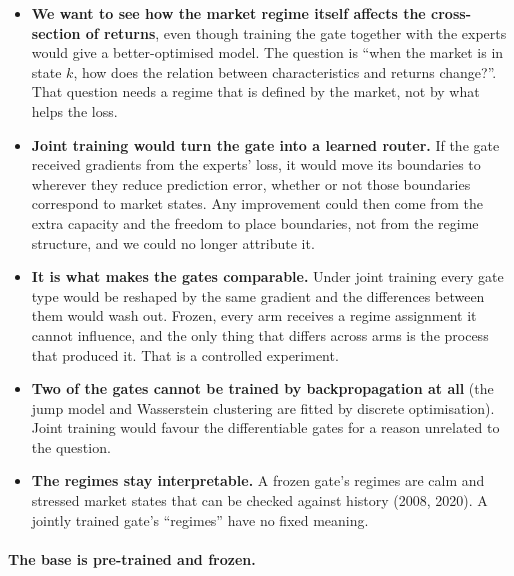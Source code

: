 \begin{whybox}
\begin{itemize}
\item \textbf{We want to see how the market regime itself affects the cross-section of returns}, even though
  training the gate together with the experts would give a better-optimised model. The question is
  ``when the market is in state $k$, how does the relation between characteristics and returns change?''.
  That question needs a regime that is defined by the market, not by what helps the loss.
\item \textbf{Joint training would turn the gate into a learned router.} If the gate received gradients from
  the experts' loss, it would move its boundaries to wherever they reduce prediction error, whether or not
  those boundaries correspond to market states. Any improvement could then come from the extra capacity
  and the freedom to place boundaries, not from the regime structure, and we could no longer attribute it.
\item \textbf{It is what makes the gates comparable.} Under joint training every gate type would be reshaped
  by the same gradient and the differences between them would wash out. Frozen, every arm receives a
  regime assignment it cannot influence, and the only thing that differs across arms is the process that
  produced it. That is a controlled experiment.
\item \textbf{Two of the gates cannot be trained by backpropagation at all} (the jump model and Wasserstein
  clustering are fitted by discrete optimisation). Joint training would favour the differentiable gates
  for a reason unrelated to the question.
\item \textbf{The regimes stay interpretable.} A frozen gate's regimes are calm and stressed market states that
  can be checked against history (2008, 2020). A jointly trained gate's ``regimes'' have no fixed meaning.
\end{itemize}
\end{whybox}

\paragraph{The base is pre-trained and frozen.} 

